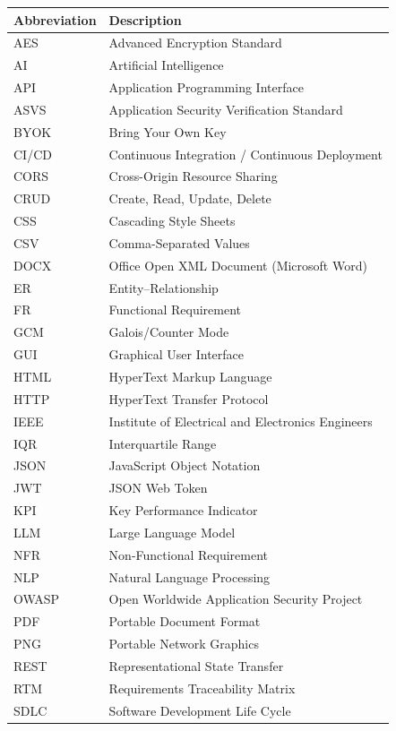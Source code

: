 \documentclass[12pt,a4paper,oneside]{report}
\begin{document}
\begin{longtable}{L{3cm} L{10cm}}
\toprule
\textbf{Abbreviation} & \textbf{Description} \\
\midrule
\endhead
AES & Advanced Encryption Standard \\
AI & Artificial Intelligence \\
API & Application Programming Interface \\
ASVS & Application Security Verification Standard \\
BYOK & Bring Your Own Key \\
CI/CD & Continuous Integration / Continuous Deployment \\
CORS & Cross-Origin Resource Sharing \\
CRUD & Create, Read, Update, Delete \\
CSS & Cascading Style Sheets \\
CSV & Comma-Separated Values \\
DOCX & Office Open XML Document (Microsoft Word) \\
ER & Entity--Relationship \\
FR & Functional Requirement \\
GCM & Galois/Counter Mode \\
GUI & Graphical User Interface \\
HTML & HyperText Markup Language \\
HTTP & HyperText Transfer Protocol \\
IEEE & Institute of Electrical and Electronics Engineers \\
IQR & Interquartile Range \\
JSON & JavaScript Object Notation \\
JWT & JSON Web Token \\
KPI & Key Performance Indicator \\
LLM & Large Language Model \\
NFR & Non-Functional Requirement \\
NLP & Natural Language Processing \\
OWASP & Open Worldwide Application Security Project \\
PDF & Portable Document Format \\
PNG & Portable Network Graphics \\
REST & Representational State Transfer \\
RTM & Requirements Traceability Matrix \\
SDLC & Software Development Life Cycle \\

\end{longtable}
\end{document}
